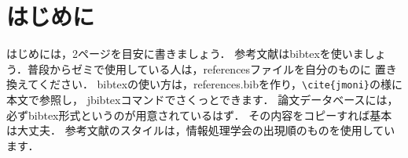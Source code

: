﻿\section{はじめに}
はじめには，2ページを目安に書きましょう．
参考文献はbibtexを使いましょう．普段からゼミで使用している人は，referencesファイルを自分のものに
置き換えてください．
bibtexの使い方は，references.bibを作り，\verb|\cite{jmoni}|の様に本文で参照\cite{jmoni}し，
jbibtexコマンドでさくっとできます．
論文データベースには，必ずbibtex形式というのが用意されているはず．
その内容をコピーすれば基本は大丈夫．
参考文献のスタイルは，情報処理学会の出現順のものを使用しています．
